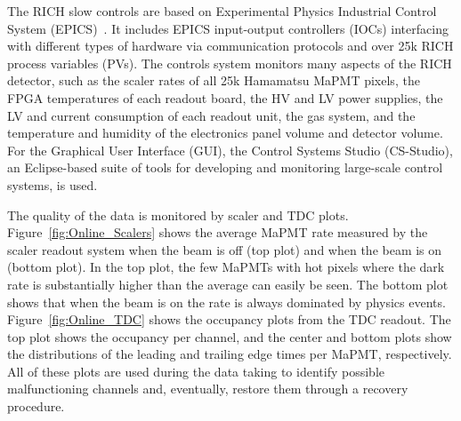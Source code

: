 \documentclass[5p,times,twocolumn]{elsarticle}
\begin{document}
The RICH slow controls are based on Experimental Physics Industrial Control System (EPICS)~\cite{Ref:EPICS}. It
includes EPICS input-output controllers (IOCs) interfacing with different types of hardware via communication
protocols and over 25k RICH process variables (PVs). The controls system monitors many aspects of the RICH
detector, such as the scaler rates of all 25k Hamamatsu MaPMT pixels, the FPGA temperatures of each readout
board, the HV and LV power supplies, the LV and current consumption of each readout unit, the gas system, and
the temperature and humidity of the electronics panel volume and detector volume. For the Graphical User Interface
(GUI), the Control Systems Studio (CS-Studio), 
an Eclipse-based suite of tools for developing and monitoring large-scale control systems, is used. 
 

The quality of the data is monitored by scaler and TDC plots. Figure~\ref{fig:Online_Scalers} shows the average 
MaPMT rate measured by the scaler readout system when the beam is off (top plot) and when the beam is on
(bottom plot). In the top plot, the few MaPMTs with hot pixels where the dark rate is substantially higher than the
average can easily be seen. The bottom plot shows that when the beam is on the rate is always dominated by physics
events. Figure~\ref{fig:Online_TDC} shows the occupancy plots from the TDC readout. The top plot shows the
occupancy per channel, and the center and bottom plots show the distributions of the leading and trailing edge times
per MaPMT, respectively. All of these plots are used during the data taking to identify possible malfunctioning channels
and, eventually, restore them through a recovery procedure.
\end{document}
